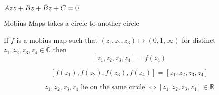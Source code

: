 \documentclass[11pt]{scrartcl}
\begin{document}
\begin{definitions}
$Az\Bar{z} + B\Bar{z} + \Bar{B}z + C = 0$
\end{definitions}
\begin{prop}
Mobius Maps takes a circle to another circle
\end{prop}
\begin{definitions}
If $f$ is a mobius map such that $(z_1,z_2,z_3) \mapsto (0,1,\infty)$ for distinct $z_1,z_2,z_3,z_4 \in \hat{\mathbb{C}}$ then $$[z_1,z_2,z_3,z_4] = f(z_4)$$
\end{definitions}
\begin{prop}
$$[f(z_1),f(z_2),f(z_3),f(z_4)] = [z_1,z_2,z_3,z_4]$$
\end{prop}
\begin{prop}
$$z_1,z_2,z_3,z_4 \text{ lie on the same circle }\iff [z_1,z_2,z_3,z_4] \in \mathbb{R}$$
\end{prop}
\end{document}
